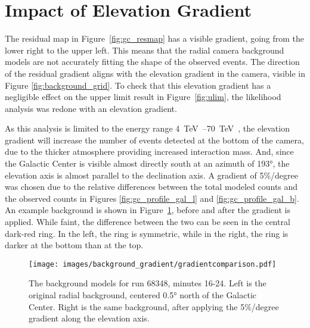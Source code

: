 \FloatBarrier

\section{Impact of Elevation Gradient}\label{sec:elevgradient}

The residual map in Figure~\ref{fig:gc_resmap} has a visible gradient, going from the lower right to the upper left.
This means that the radial camera background models are not accurately fitting the shape of the observed events.
The direction of the residual gradient aligns with the elevation gradient in the camera, visible in Figure \ref{fig:background_grid}.
To check that this elevation gradient has a negligible effect on the upper limit result in Figure~\ref{fig:ulim}, the likelihood analysis was redone with an elevation gradient.

As this analysis is limited to the energy range \SIrange{4}{70}{\TeV{}}, the elevation gradient will increase the number of events detected at the bottom of the camera, due to the thicker atmosphere providing increased interaction mass.
And, since the Galactic Center is visible almost directly south at an azimuth of \ang{193}, the elevation axis is almost parallel to the declination axis.
A gradient of 5\%/degree was chosen due to the relative differences between the total modeled counts and the observed counts in Figures \ref{fig:gc_profile_gal_l} and \ref{fig:gc_profile_gal_b}.
An example background is shown in Figure~\ref{fig:bkg_flatvsgrad}, before and after the gradient is applied.
While faint, the difference between the two can be seen in the central dark-red ring.
In the left, the ring is symmetric, while in the right, the ring is darker at the bottom than at the top.

\begin{figure}[tb]
  \centering
  \texttt{[image: images/background\_gradient/gradientcomparison.pdf]}
  \caption[Background Gradient Comparison]{
    The background models for run 68348, minutes 16-24.
    Left is the original radial background, centered \ang{0.5} north of the Galactic Center.
    Right is the same background, after applying the 5\%/degree gradient along the elevation axis.
  }
  \label{fig:bkg_flatvsgrad}
\end{figure}


